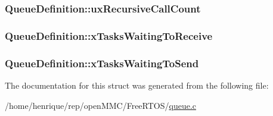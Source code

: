 \hypertarget{structQueueDefinition_a2cf88e286477f6f89fe1009d722dc4cf}{
\subsubsection[{ux\-Recursive\-Call\-Count}]{ Queue\-Definition\-::ux\-Recursive\-Call\-Count}}\label{structQueueDefinition_a2cf88e286477f6f89fe1009d722dc4cf}
\hypertarget{structQueueDefinition_af6d61526f77beee659cd604a0c473359}{
\subsubsection[{x\-Tasks\-Waiting\-To\-Receive}]{ Queue\-Definition\-::x\-Tasks\-Waiting\-To\-Receive}}\label{structQueueDefinition_af6d61526f77beee659cd604a0c473359}
\hypertarget{structQueueDefinition_aaab135c4345cb0393d6ff3cd5164c7b2}{
\subsubsection[{x\-Tasks\-Waiting\-To\-Send}]{ Queue\-Definition\-::x\-Tasks\-Waiting\-To\-Send}}\label{structQueueDefinition_aaab135c4345cb0393d6ff3cd5164c7b2}


The documentation for this struct was generated from the following file\-:\begin{DoxyCompactItemize}
\item 
/home/henrique/rep/open\-M\-M\-C/\-Free\-R\-T\-O\-S/\hyperlink{queue_8c}{queue.\-c}\end{DoxyCompactItemize}
